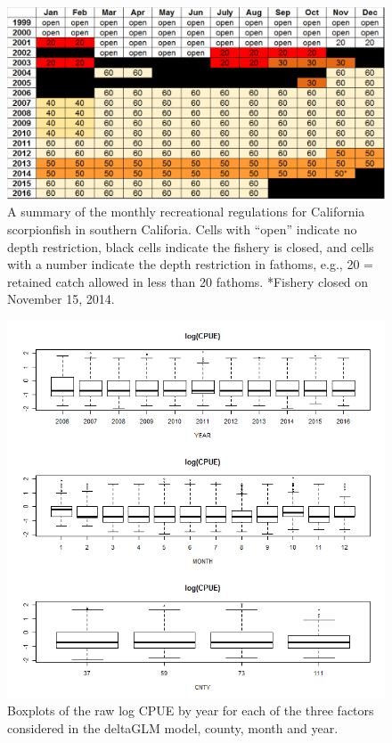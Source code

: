 \documentclass[12pt,]{article}
\begin{document}
\begin{figure}[htbp]
\centering
\includegraphics{Figures/Rec_regs.pdf}
\caption{A summary of the monthly recreational regulations for
California scorpionfish in southern Califoria. Cells with ``open''
indicate no depth restriction, black cells indicate the fishery is
closed, and cells with a number indicate the depth restriction in
fathoms, e.g., 20 = retained catch allowed in less than 20 fathoms.
*Fishery closed on November 15, 2014. \label{fig:recregs}}
\end{figure}

\begin{figure}[htbp]
\centering
\includegraphics{Figures/Fleet4_RecPR_dockside_lograwCPUE.png}
\caption{Boxplots of the raw log CPUE by year for each of the three
factors considered in the deltaGLM model, county, month and year.
\label{fig:Fleet4_RecPR_dockside_lograwCPUE}}
\end{figure}
\end{document}
